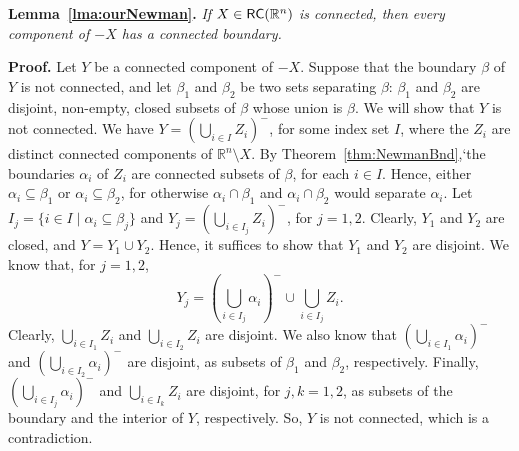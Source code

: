 \documentclass{article}
\newcommand{\R}{\mathbb{R}}
\newcommand{\RC}{{\sf RC}}
\newcommand{\tc}[2][]{{#2}^{-_{#1}}}
\newcommand{\qedsymbol}{\ding{113}}
\newenvironment{proof}{\par\noindent\textbf{Proof.}}{\mbox{}\hfill\qedsymbol\par\bigskip}
\newenvironment{swetheorem}[1]{\par\medskip\noindent\textbf{#1.}\hspace*{0.5em}\em}{\par\smallskip}
\begin{document}
\begin{swetheorem}{Lemma~\ref{lma:ourNewman}}
If $X \in \RC(\R^n)$ is connected, then every component of $-X$ has a
connected boundary.
\end{swetheorem}
\begin{proof}
Let $Y$ be a connected component of $-X$.  Suppose that the boundary
$\beta$ of $Y$ is not connected, and let $\beta_1$ and $\beta_2$ be
two sets separating $\beta$: $\beta_1$ and $\beta_2$ are disjoint,
non-empty, closed subsets of $\beta$ whose union is $\beta$. We will
show that $Y$ is not connected.  We have $Y=\tc{(\bigcup_{i\in
    I}Z_i)}$, for some index set $I$, where the $Z_i$ are distinct
connected components of $\R^n\setminus X$.  By
Theorem~\ref{thm:NewmanBnd},`the boundaries $\alpha_i$ of $Z_i$ are
connected subsets of $\beta$, for each $i\in I$. Hence, either
$\alpha_i\subseteq\beta_1$ or $\alpha_i\subseteq\beta_2$, for
otherwise $\alpha_i\cap\beta_1$ and $\alpha_i\cap\beta_2$ would
separate $\alpha_i$. Let $I_j=\{i\in I\mid \alpha_i\subseteq
\beta_j\}$ and $Y_j=\tc{(\bigcup_{i\in I_j}Z_i)}$, for $j=1,2$.
Clearly, $Y_1$ and $Y_2$ are closed, and $Y=Y_1\cup Y_2$. Hence, it
suffices to show that $Y_1$ and $Y_2$ are disjoint. We know that, for
$j=1,2$,
$$
Y_j=\tc{(\bigcup_{i\in I_j}\alpha_i)}\cup\bigcup_{i\in I_j}Z_i.
$$
Clearly, $\bigcup_{i\in I_1}Z_i$ and $\bigcup_{i\in I_2}Z_i$ are disjoint. We also know that 
$\tc{(\bigcup_{i\in I_1}\alpha_i)}$ and $\tc{(\bigcup_{i\in I_2}\alpha_i)}$ are disjoint, as 
subsets of $\beta_1$ and $\beta_2$, respectively. Finally, $\tc{(\bigcup_{i\in I_j}\alpha_i)}$ 
and $\bigcup_{i\in I_k}Z_i$ are disjoint, for $j,k=1,2$, as subsets of the boundary and the 
interior of $Y$, respectively. So, $Y$ is not connected, which is a contradiction.
\end{proof}
\end{document}
